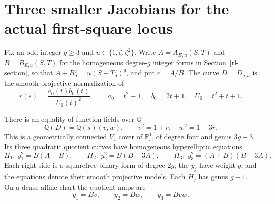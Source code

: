 \section{Three smaller Jacobians for the actual first-square locus}
\label{hg-section}

Fix an odd integer $g\geq3$ and $u\in\{1,\zeta,\zeta^2\}$.
Write $A=A_{E,u}(S,T)$ and $B=B_{E,u}(S,T)$ for the homogeneous
degree-$g$ integer forms in Section~\ref{rl-section}, so that
$A+B\zeta=u(S+T\zeta)^g$, and put $r=A/B$.
The curve $D=D_{g,u}$ is the smooth projective normalization of
\begin{equation}\label{hg-original}
 r(s)=\frac{a_0(t)b_0(t)}{U_0(t)^2},\qquad
 a_0=t^2-1,\quad b_0=2t+1,\quad U_0=t^2+t+1.
\end{equation}

\begin{theorem}\label{hg-three-quotients}
There is an equality of function fields over $\mathbb Q$
\begin{equation}\label{hg-biquadratic}
 \mathbb Q(D)=\mathbb Q(s)(v,w),\qquad
 v^2=1+r,\quad w^2=1-3r.
\end{equation}
This is a geometrically connected $V_4$ cover of $\mathbb P^1_s$,
of degree four and genus $3g-3$. Its three quadratic quotient
curves have homogeneous hyperelliptic equations
\begin{equation}\label{hg-hyperelliptic}
 H_1:\ y_1^2=B(A+B),\qquad
 H_2:\ y_2^2=B(B-3A),\qquad
 H_3:\ y_3^2=(A+B)(B-3A).
\end{equation}
Each right side is a squarefree binary form of degree $2g$;
the $y_j$ have weight $g$, and the equations denote their smooth
projective models. Each $H_j$ has genus $g-1$. On a dense affine
chart the quotient maps are
\[
 y_1=Bv,\qquad y_2=Bw,\qquad y_3=Bvw.
\]
\end{theorem}

